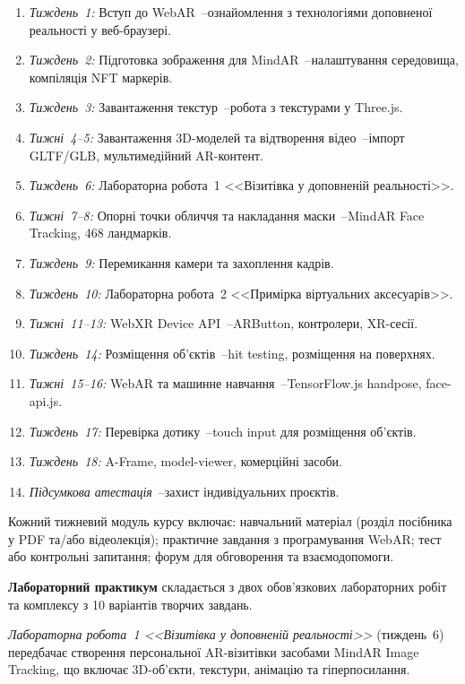 \begin{enumerate}
\item \textit{Тиждень~1:} Вступ до WebAR~--ознайомлення з технологіями доповненої реальності у веб-браузері.
\item \textit{Тиждень~2:} Підготовка зображення для MindAR~--налаштування середовища, компіляція NFT маркерів.
\item \textit{Тиждень~3:} Завантаження текстур~--робота з текстурами у Three.js.
\item \textit{Тижні~4--5:} Завантаження 3D-моделей та відтворення відео~--імпорт GLTF/GLB, мультимедійний AR-контент.
\item \textit{Тиждень~6:} Лабораторна робота~1 <<Візитівка у доповненій реальності>>.
\item \textit{Тижні~7--8:} Опорні точки обличчя та накладання маски~--MindAR Face Tracking, 468 ландмарків.
\item \textit{Тиждень~9:} Перемикання камери та захоплення кадрів.
\item \textit{Тиждень~10:} Лабораторна робота~2 <<Примірка віртуальних аксесуарів>>.
\item \textit{Тижні~11--13:} WebXR Device API~--ARButton, контролери, XR-сесії.
\item \textit{Тиждень~14:} Розміщення об'єктів~--hit testing, розміщення на поверхнях.
\item \textit{Тижні~15--16:} WebAR та машинне навчання~--TensorFlow.js handpose, face-api.js.
\item \textit{Тиждень~17:} Перевірка дотику~--touch input для розміщення об'єктів.
\item \textit{Тиждень~18:} A-Frame, model-viewer, комерційні засоби.
\item \textit{Підсумкова атестація}~--захист індивідуальних проєктів.
\end{enumerate}

Кожний тижневий модуль курсу включає: навчальний матеріал (розділ посібника у PDF та/або відеолекція); практичне завдання з програмування WebAR; тест або контрольні запитання; форум для обговорення та взаємодопомоги.

\textbf{Лабораторний практикум} складається з двох обов'язкових лабораторних робіт та комплексу з 10 варіантів творчих завдань.

\textit{Лабораторна робота~1 <<Візитівка у доповненій реальності>>} (тиждень~6) передбачає створення персональної AR-візитівки засобами MindAR Image Tracking, що включає 3D-об'єкти, текстури, анімацію та гіперпосилання.

